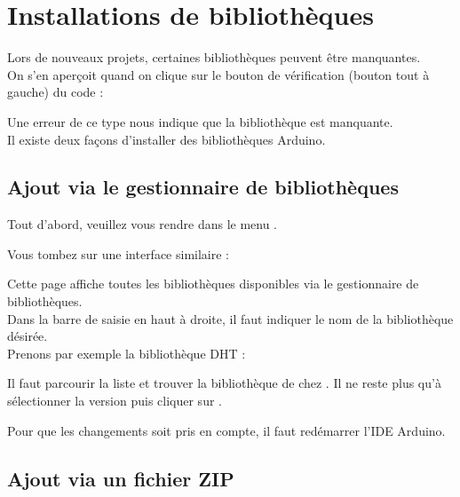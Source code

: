 \chapter{Installations de bibliothèques}

  Lors de nouveaux projets, certaines bibliothèques peuvent être manquantes.\\
  On s'en aperçoit quand on clique sur le bouton de vérification (bouton tout à gauche) du code :



  Une erreur de ce type nous indique que la bibliothèque  est manquante.\\

  
  Il existe deux façons d'installer des bibliothèques Arduino.

  \section{Ajout via le gestionnaire de bibliothèques}

  Tout d'abord, veuillez vous rendre dans le menu .


  Vous tombez sur une interface similaire :


  Cette page affiche toutes les bibliothèques disponibles via le gestionnaire de bibliothèques.\\
  Dans la barre de saisie en haut à droite, il faut indiquer le nom de la bibliothèque désirée. \\
  Prenons par exemple la bibliothèque DHT :


  Il faut parcourir la liste et trouver la bibliothèque  de chez .
  Il ne reste plus qu'à sélectionner la version puis cliquer sur .

  Pour que les changements soit pris en compte, il faut redémarrer l'IDE  Arduino.


  \section{Ajout via un fichier ZIP}

